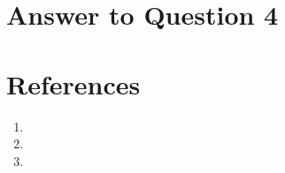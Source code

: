 \documentclass[
	letterpaper, %
]{jdf}
\begin{document}
\subsection {}

\newpage

\section{Answer to Question 4}


\newpage

\section{References}

\printbibliography[heading=none]
\begin{enumerate}
    \item 
    \item 
    \item 

\end{enumerate}
\end{document}
